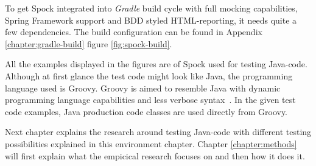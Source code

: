     To get Spock integrated into \textit{Gradle} build cycle with full mocking capabilities, Spring Framework support and BDD styled HTML-reporting, it needs
    quite a few dependencies. The build configuration can be found in Appendix \ref{chapter:gradle-build} figure \ref{fig:spock-build}.

    All the examples displayed in the figures are of Spock used for testing Java-code. Although at first glance the test code might
    look like Java, the programming language used is Groovy. Groovy is aimed to resemble Java with dynamic programming language
    capabilities and less verbose syntax~\cite{kapelonis2016java}. In the given test code examples, Java production code classes are used directly
    from Groovy.

    Next chapter explains the research around testing Java-code with different testing possibilities explained in this environment
    chapter. Chapter \ref{chapter:methods} will first explain what the empicical research focuses on and then how it does it.

